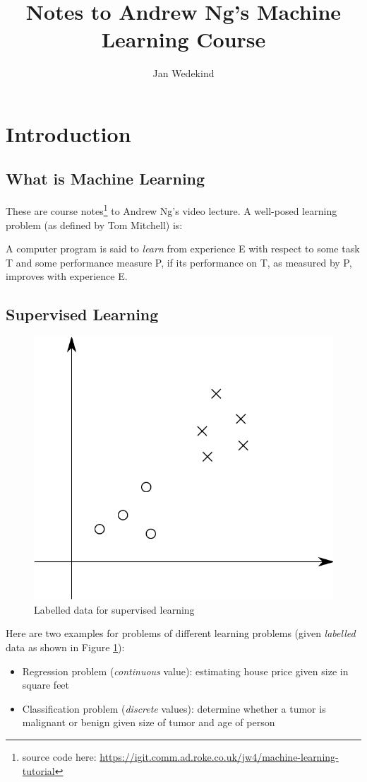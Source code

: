 \documentclass[a4paper,twoside,10pt]{article}
\title{Notes to Andrew Ng's Machine Learning Course}
\author{Jan Wedekind}
\begin{document}
\maketitle

\section{Introduction}

\subsection{What is Machine Learning}
These are course notes\footnote{source code here: \url{https://igit.comm.ad.roke.co.uk/jw4/machine-learning-tutorial}} to Andrew Ng's video lecture\citep{andrewng}.
A well-posed learning problem (as defined by Tom Mitchell) is:
\begin{displayquote}
  A computer program is said to \emph{learn} from experience E with respect to some task T and some performance measure P, if its performance on T, as measured by P, improves with experience E.
\end{displayquote}

\subsection{Supervised Learning}
\begin{figure}[htbp]
  \begin{center}
    \includegraphics[width=.4\textwidth]{supervised}
    \caption{Labelled data for supervised learning\label{fig:supervised}}
  \end{center}
\end{figure}
Here are two examples for problems of different learning problems (given \emph{labelled} data as shown in Figure \ref{fig:supervised}):
\begin{itemize}
  \item Regression problem (\emph{continuous} value): estimating house price given size in square feet
  \item Classification problem (\emph{discrete} values): determine whether a tumor is malignant or benign given size of tumor and age of person
\end{itemize}
\end{document}
